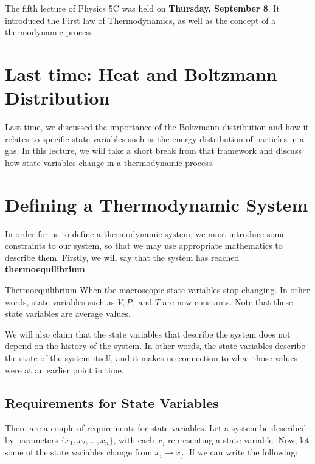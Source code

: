 The fifth lecture of Physics 5C was held on  \textbf{Thursday, September 8}. It introduced the First law of Thermodynamics, as well as the concept of a thermodynamic process.
    
    
    \section{Last time: Heat and Boltzmann Distribution}

    Last time, we discussed the importance of the Boltzmann distribution and how it relates to specific state variables such as the energy distribution of particles in a gas. In this lecture, we will take a short break from that framework and discuss how state variables change in a thermodynamic process. 


    \section{Defining a Thermodynamic System}

    In order for us to define a thermodynamic system, we must introduce some constraints to our system, so that we may use appropriate mathematics to describe them. Firstly, we will say that the system has reached \textbf{thermoequilibrium}

    \begin{definition}{Thermoequilibrium}{}
        When the macroscopic state variables stop changing. In other words, state variables such as $V, P,$ and $T$ are now constants. Note that these state variables are average values. 
    \end{definition}

    We will also claim that the state variables that describe the system does not depend on the history of the system. In other words, the state variables describe the state of the system itself, and it makes no connection to what those values were at an earlier point in time.

    \subsection{Requirements for State Variables}

    There are a couple of requirements for state variables. Let a system be described by parameters $\{x_1, x_2, \dots, x_n\}$, with each $x_j$ representing a state variable. Now, let some of the state variables change from $x_i \to x_f$. If we can write the following:

